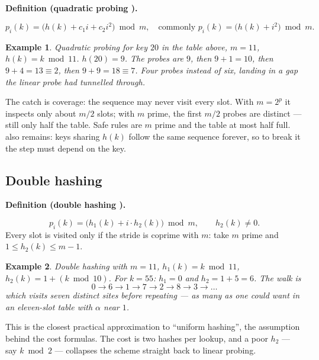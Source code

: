 \documentclass[11pt]{article}
\newtheorem{example}{Example}[section]
\newenvironment{definitionbox}[1]{%
  \par\noindent\textbf{Definition (#1).}\ \itshape
}{\par\vspace{0.3em}}
\begin{document}
\begin{definitionbox}{quadratic probing \cite{Sedgewick2011_algorithms}}
\[ p_i(k) = \big(h(k) + c_1 i + c_2 i^2\big) \bmod m,
   \quad\text{commonly } p_i(k) = \big(h(k) + i^2\big) \bmod m . \]
\end{definitionbox}

\begin{example}
\emph{Quadratic probing for key $20$ in the table above, $m = 11$, $h(k) = k \bmod 11$.} $h(20) = 9$. The probes are $9$, then $9+1 = 10$, then $9+4 = 13 \equiv 2$, then $9+9 = 18 \equiv 7$. Four probes instead of six, landing in a gap the linear probe had tunnelled through.
\end{example}

The catch is coverage: the sequence may never visit every slot. With $m = 2^p$ it inspects only about $m/2$ slots; with $m$ prime, the first $m/2$ probes are distinct --- still only half the table. Safe rules are $m$ prime and the table at most half full.  also remains: keys sharing $h(k)$ follow the same sequence forever, so to break it the step must depend on the key.

\subsection{Double hashing}

\begin{definitionbox}{double hashing \cite{Wirth2004_algorithms_data_structures,Sedgewick2011_algorithms}}
\[ p_i(k) = \big(h_1(k) + i \cdot h_2(k)\big) \bmod m ,
   \qquad h_2(k) \neq 0 . \]
Every slot is visited only if the stride is coprime with $m$: take $m$ prime and $1 \le h_2(k) \le m-1$.
\end{definitionbox}

\begin{example}
\emph{Double hashing with $m = 11$, $h_1(k) = k \bmod 11$, $h_2(k) = 1 + (k \bmod 10)$.} For $k = 55$: $h_1 = 0$ and $h_2 = 1 + 5 = 6$. The walk is
\[ 0 \to 6 \to 1 \to 7 \to 2 \to 8 \to 3 \to \dots \]
which visits seven distinct sites before repeating --- as many as one could want in an eleven-slot table with $\alpha$ near $1$.
\end{example}

This is the closest practical approximation to ``uniform hashing'', the assumption behind the cost formulas. The cost is two hashes per lookup, and a poor $h_2$ --- say $k \bmod 2$ --- collapses the scheme straight back to linear probing.
\end{document}
